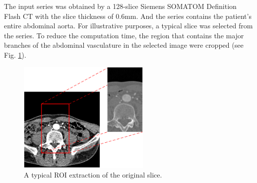 The input series was obtained by a 128-slice Siemens SOMATOM Definition Flash CT with the slice thickness of 0.6mm.
And the series contains the patient's entire abdominal aorta.
For illustrative purposes, a typical slice was selected from the series.
To reduce the computation time, the region that contains the major branches of the abdominal vasculature in the selected image were cropped (see Fig. \ref{fig_roi}).
\begin{figure}[t]
\centering
\includegraphics[width=2.5in]{Figures/chap03/ROI.png}
\caption{A typical ROI extraction of the original slice.}
\label{fig_roi}
\end{figure}

